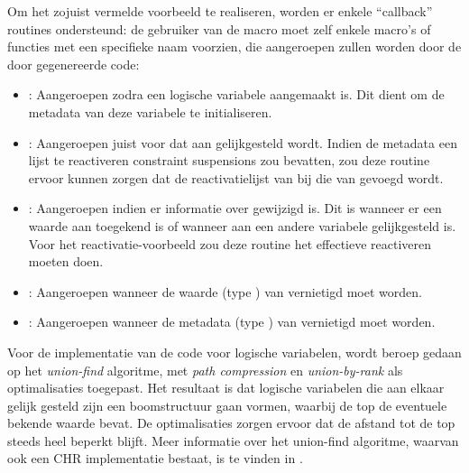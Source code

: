 {Om het zojuist vermelde voorbeeld te realiseren, worden er enkele ``callback'' routines ondersteund: de gebruiker van de  macro moet zelf enkele macro's of functies met een specifieke naam voorzien, die aangeroepen zullen worden door de door  gegenereerde code: \begin{itemize}
  \item {}: Aangeroepen zodra een logische variabele  aangemaakt is. Dit dient om de metadata van deze variabele te initialiseren.
  \item {}: Aangeroepen juist voor dat  aan  gelijkgesteld wordt. Indien de metadata een lijst te reactiveren constraint suspensions zou bevatten, zou deze routine ervoor kunnen zorgen dat de reactivatielijst van  bij die van  gevoegd wordt.
  \item {}: Aangeroepen indien er informatie over  gewijzigd is. Dit is wanneer er een waarde aan toegekend is of wanneer  aan een andere variabele gelijkgesteld is. Voor het reactivatie-voorbeeld zou deze routine het effectieve reactiveren moeten doen.
  \item {}: Aangeroepen wanneer de waarde (type ) van  vernietigd moet worden.
  \item {}: Aangeroepen wanneer de metadata (type ) van  vernietigd moet worden.
\end{itemize}

Voor de implementatie van de code voor logische variabelen, wordt beroep gedaan op het {\em union-find} algoritme, met {\em path compression} en {\em union-by-rank} als optimalisaties toegepast. Het resultaat is dat logische variabelen die aan elkaar gelijk gesteld zijn een boomstructuur gaan vormen, waarbij de top de eventuele bekende waarde bevat. De optimalisaties zorgen ervoor dat de afstand tot de top steeds heel beperkt blijft. Meer informatie over het union-find algoritme, waarvan ook een CHR implementatie bestaat, is te vinden in \cite{tom:unionfind:techreport}.

}
